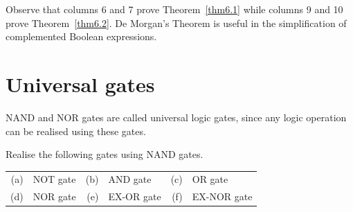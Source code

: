 Observe that columns 6 and 7 prove Theorem~\ref{thm6.1} while columns 9 and 10 prove Theorem~\ref{thm6.2}. De Morgan's Theorem is useful in the simplification of complemented Boolean expressions.

\section{Universal gates}\label{sec6.28}

NAND and NOR gates are called universal logic gates, since any logic operation can be realised using these gates.

\begin{example}\label{exam6.27}
Realise the following gates using NAND gates.
\begin{center}
\begin{tabular}{r@{\;\,}l@{\qquad}r@{\;\,}l@{\qquad}r@{\;\,}l}
(a) & NOT gate & (b) & AND gate & (c) & OR gate\\[4pt]
(d) & NOR gate & (e) & EX-OR gate & (f) & EX-NOR gate
\end{tabular}
\end{center}
\end{example}

